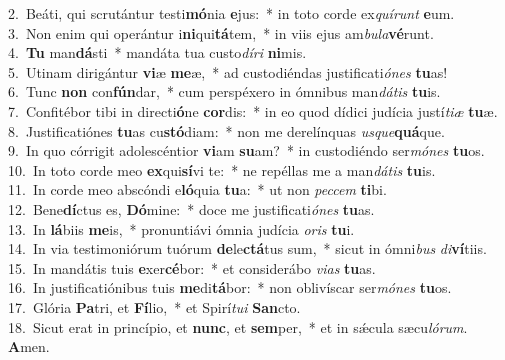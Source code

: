 {2.~}Beáti, qui scrutántur testi\textbf{mó}nia \textbf{e}jus:~* in toto corde ex\textit{quí}\textit{runt} \textbf{e}um.\\
{3.~}Non enim qui operántur i\textbf{ni}qui\textbf{tá}tem,~* in viis ejus am\textit{bu}\textit{la}\textbf{vé}runt.\\
{4.~}\textbf{Tu} man\textbf{dá}sti~* mandáta tua custo\textit{dí}\textit{ri} \textbf{ni}mis.\\
{5.~}Utinam dirigántur \textbf{vi}æ \textbf{me}æ,~* ad custodiéndas justificati\textit{ó}\textit{nes} \textbf{tu}as!\\
{6.~}Tunc \textbf{non} con\textbf{fún}dar,~* cum perspéxero in ómnibus man\textit{dá}\textit{tis} \textbf{tu}is.\\
{7.~}Confitébor tibi in directi\textbf{ó}ne \textbf{cor}dis:~* in eo quod dídici judícia justí\textit{ti}\textit{æ} \textbf{tu}æ.\\
{8.~}Justificatiónes \textbf{tu}as cu\textbf{stó}diam:~* non me derelínquas \textit{us}\textit{que}\textbf{quá}que.\\
{9.~}In quo córrigit adolescéntior \textbf{vi}am \textbf{su}am?~* in custodiéndo ser\textit{mó}\textit{nes} \textbf{tu}os.\\
{10.~}In toto corde meo \textbf{ex}qui\textbf{sí}vi te:~* ne repéllas me a man\textit{dá}\textit{tis} \textbf{tu}is.\\
{11.~}In corde meo abscóndi e\textbf{ló}quia \textbf{tu}a:~* ut non \textit{pec}\textit{cem} \textbf{ti}bi.\\
{12.~}Bene\textbf{dí}ctus es, \textbf{Dó}mine:~* doce me justificati\textit{ó}\textit{nes} \textbf{tu}as.\\
{13.~}In \textbf{lá}biis \textbf{me}is,~* pronuntiávi ómnia judícia \textit{o}\textit{ris} \textbf{tu}i.\\
{14.~}In via testimoniórum tuórum \textbf{de}le\textbf{ctá}tus sum,~* sicut in ómni\textit{bus} \textit{di}\textbf{ví}tiis.\\
{15.~}In mandátis tuis \textbf{e}xer\textbf{cé}bor:~* et considerábo \textit{vi}\textit{as} \textbf{tu}as.\\
{16.~}In justificatiónibus tuis \textbf{me}di\textbf{tá}bor:~* non oblivíscar ser\textit{mó}\textit{nes} \textbf{tu}os.\\
{17.~}Glória \textbf{Pa}tri, et \textbf{Fí}lio,~* et Spirí\textit{tu}\textit{i} \textbf{San}cto.\\
{18.~}Sicut erat in princípio, et \textbf{nunc}, et \textbf{sem}per,~* et in sǽcula sæcu\textit{ló}\textit{rum}. \textbf{A}men.\\

